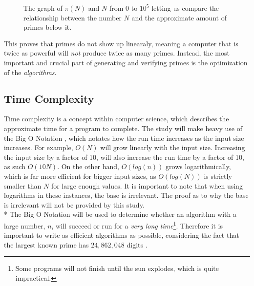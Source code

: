 \documentclass[main.tex]{subfiles}
\begin{document}
\begin{figure}
    \begin{center}
    \end{center}
\caption{The graph of $\pi(N)$ and $N$ from $0$ to $10^{5}$ letting us compare the relationship between the number $N$ and the approximate amount of primes below it.}
\end{figure}

This proves that primes do not show up linearaly, meaning a computer that is twice as powerful will \textit{not} produce twice as many primes. Instead, the most important and crucial part of generating and verifying primes is the optimization of the \textit{algorithms}.

\subsection{Time Complexity}

Time complexity \cite{theorem:time_comp} is a concept within computer science, which describes the approximate time for a program to complete. The study will make heavy use of the Big O Notation \cite{theorem:big_O}, which notates how the run time increases as the input size increases. For example, $O(N)$ will grow linearly with the input size. Increasing the input size by a factor of 10, will also increase the run time by a factor of 10, as such $O(10N)$. On the other hand, $O(log(n))$ grows logarithmically, which is far more efficient for bigger input sizes, as $O(log(N))$ is strictly smaller than $N$ for large enough values. It is important to note that when using logarithms in these instances, the base is irrelevant. The proof as to why the base is irrelevant will not be provided by this study.
\newline
\\*
The Big O Notation will be used to determine whether an algorithm with a large number, $n$, will succeed or run for a \textit{very long time}\footnote{Some programs will not finish until the sun explodes, which is quite impractical.}. Therefore it is important to write as efficient algorithms as possible, considering the fact that the largest known prime has $24,862,048$ digits \cite{prime:largest_digits}. 
\end{document}

